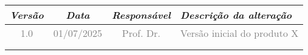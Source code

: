 
\begin{table}[H]
	\centering
	\begin{tabularx}{\textwidth}{|c|c|c|X|}
		\hline
		\textcolor{projectMainColor}{\textit{Versão}} &
		\textcolor{projectMainColor}{\textit{Data}} &
		\textcolor{projectMainColor}{\textit{Responsável}} &
		\textcolor{projectMainColor}{\textit{Descrição da alteração}} \\
		\hline
		\textcolor{gray}{1.0} & \textcolor{gray}{01/07/2025} & \textcolor{gray}{Prof. Dr.} & \textcolor{gray}{Versão inicial do produto X} \\
		\hline
		& & & \\
		\hline
		& & & \\
		\hline
	\end{tabularx}
\end{table}